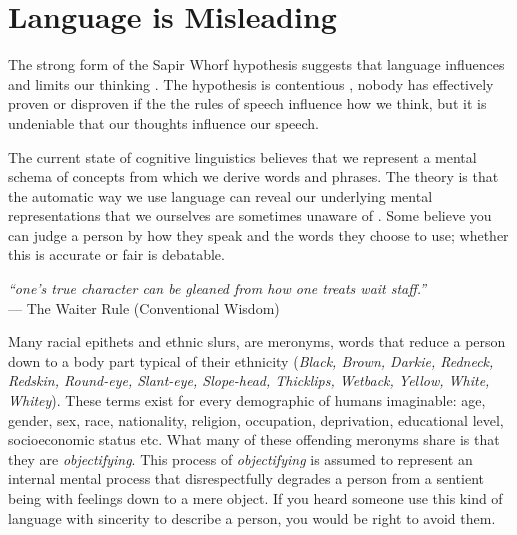 

\section{Language is Misleading}

The strong form of the Sapir Whorf hypothesis suggests that language influences and limits our thinking \cite{whorf2012language}. The hypothesis is contentious \cite{hussein2012sapir}, nobody has effectively proven or disproven if the the rules of speech influence how we think, but it is undeniable that our thoughts influence our speech. 

The current state of cognitive linguistics believes that we represent a mental schema of concepts from which we derive words and phrases. The theory is that the automatic way we use language can reveal our underlying mental representations that we ourselves are sometimes unaware of \cite{lakoff2008metaphors, lakoff2008women, pinker2007stuff}. Some believe you can judge a person by how they speak and the words they choose to use; whether this is accurate or fair is debatable.

\begin{center}
\textit{``one's true character can be gleaned from how one treats wait staff.''}
\\ --- The Waiter Rule (Conventional Wisdom)
\end{center}

Many racial epithets and ethnic slurs, are meronyms, words that reduce a person down to a body part typical of their ethnicity (\textit{Black, Brown, Darkie, Redneck, Redskin, Round-eye, Slant-eye, Slope-head, Thicklips, Wetback, Yellow, White, Whitey}). These terms exist for every demographic of humans imaginable: age, gender, sex, race, nationality, religion, occupation, deprivation, educational level, socioeconomic status etc. What many of these offending meronyms share is that they are \textit{objectifying}. This process of \textit{objectifying} is assumed to represent an internal mental process that disrespectfully degrades a person from a sentient being with feelings down to a mere object. If you heard someone use this kind of language with sincerity to describe a person, you would be right to avoid them.


